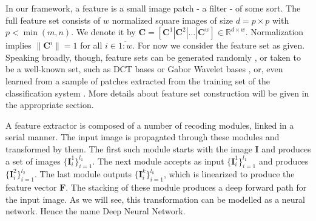 \documentclass[12pt,a4paper,oneside,english]{UPBThesis}
\newcommand{\hctimes}[2]{{#1}\!\times\!{#2}}
\newcommand{\hcrange}[2]{\overline{{#1}\colon\!\!{#2}}}
\begin{document}
In our framework, a feature is a small image patch - a filter - of some sort. The full feature set consists of $w$ normalized square images of size $d = \hctimes{p}{p}$ with $p < \min(m,n)$. We denote it by $\textbf{C} = \left[ \textbf{C}^1 \left|\right. \textbf{C}^2 \left|\right. \dots \left|\right. \textbf{C}^w \right] \in \mathbb{R}^{\hctimes{d}{w}}$. Normalization implies $\|\mathbf{C}^i\| = 1$ for all $i \in \hcrange{1}{w}$. For now we consider the feature set as given. Speaking broadly, though, feature sets can be generated randomly \cite{random-weights-feature-learning,beyond-simple-featureshow}, or taken to be a well-known set, such as DCT bases or Gabor Wavelet bases \cite{simple-method-sparse-coding}, or, even learned from a sample of patches extracted from the training set of the classification system \cite{emergence-sparse-coding,sparse-coding-strategy-V1,tiny-images}. More details about feature set construction will be given in the appropriate section.

A feature extractor is composed of a number of recoding modules, linked in a serial manner. The input image is propagated through these modules and transformed by them. The first such module starts with the image $\textbf{I}$ and produces a set of images $\{\textbf{I}_i^1\}_{i=1}^{l_1}$. The next module accepts as input $\{\textbf{I}_i^1\}_{i=1}^{l_1}$ and produces $\{\textbf{I}_i^2\}_{i=1}^{l_2}$. The last module outputs $\{\textbf{I}_i^k\}_{i=1}^{l_k}$, which is linearized to produce the feature vector $\mathbf{F}$. The stacking of these module produces a deep forward path for the input image. As we will see, this transformation can be modelled as a neural network. Hence the name Deep Neural Network. 
\end{document}
